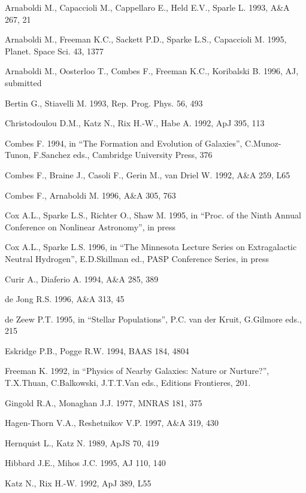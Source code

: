 \begin{thebibliography}{}

\bibitem{} Arnaboldi M., Capaccioli M., Cappellaro E., Held E.V.,
Sparle L. 1993, A\&A 267, 21

\bibitem{} Arnaboldi M., Freeman K.C., Sackett P.D., Sparke L.S.,
Capaccioli M. 1995, Planet. Space Sci. 43, 1377

\bibitem{} Arnaboldi M., Oosterloo T., Combes F., Freeman K.C., Koribalski B.
1996, AJ, submitted

\bibitem{} Bertin G., Stiavelli M. 1993, Rep. Prog. Phys. 56, 493

\bibitem{} Christodoulou D.M., Katz N., Rix H.-W., Habe A. 1992, 
ApJ 395, 113

\bibitem{} Combes F. 1994, in ``The Formation and Evolution of
Galaxies'', C.Munoz-Tunon, F.Sanchez eds., Cambridge University
Press, 376 

\bibitem{} Combes F., Braine J., Casoli F., Gerin M., van Driel W. 1992,
A\&A 259, L65

\bibitem{} Combes F., Arnaboldi M. 1996, A\&A 305, 763

\bibitem{} Cox A.L., Sparke L.S., Richter O., Shaw M. 1995, in 
``Proc. of the Ninth Annual Conference on Nonlinear Astronomy'', in press

\bibitem{} Cox A.L., Sparke L.S. 1996, in ``The Minnesota Lecture Series
on Extragalactic Neutral Hydrogen'', E.D.Skillman ed., PASP Conference
Series, in press

\bibitem{} Curir A., Diaferio A. 1994, A\&A 285, 389

\bibitem{} de Jong R.S. 1996, A\&A 313, 45

\bibitem{} de Zeew P.T. 1995, in ``Stellar Populations'', 
P.C. van der Kruit, G.Gilmore eds., 215 

\bibitem{} Eskridge P.B., Pogge R.W. 1994, BAAS 184, 4804

\bibitem{}  Freeman K. 1992, in ``Physics of Nearby Galaxies: Nature or
 Nurture?'', T.X.Thuan, C.Balkowski, J.T.T.Van eds., Editions 
Frontieres, 201. 

\bibitem{} Gingold R.A., Monaghan J.J. 1977, MNRAS 181, 375

\bibitem{} Hagen-Thorn V.A., Reshetnikov V.P. 1997, A\&A 319, 430

\bibitem{} Hernquist L., Katz N. 1989, ApJS 70, 419

\bibitem{} Hibbard J.E., Mihos J.C. 1995, AJ 110, 140

\bibitem{} Katz N., Rix H.-W. 1992, ApJ 389, L55


\end{thebibliography}
